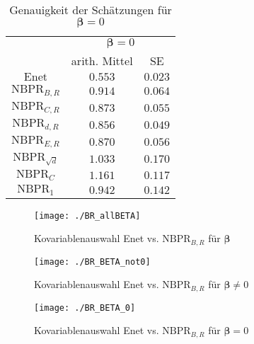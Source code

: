 \documentclass{beamer}
\begin{document}
\begin{frame}
\begin{table}[h]
\begin{tabular}{ccc}
\multicolumn{1}{l}{}     & \multicolumn{2}{c}{$\boldsymbol{\beta}=0$} \\ \cline{2-3} 
\multicolumn{1}{l}{}     & arith. Mittel           & SE               \\ \cline{2-3} 
$\text{Enet}$            & $0.553$                 & $0.023$          \\
$\text{NBPR}_{B,R}$      & $0.914$                 & $0.064$          \\
$\text{NBPR}_{C,R}$      & $0.873$                 & $0.055$          \\
$\text{NBPR}_{d,R}$      & $0.856$                 & $0.049$          \\
$\text{NBPR}_{E,R}$      & $0.870$                 & $0.056$          \\
$\text{NBPR}_{\sqrt{d}}$ & $1.033$                 & $0.170$          \\
$\text{NBPR}_{C}$        & $1.161$                 & $0.117$          \\
$\text{NBPR}_{1}$        & $0.942$                 & $0.142$         
\end{tabular}
\caption{Genauigkeit der Schätzungen für $\boldsymbol{\beta}=0$}
\end{table}
\end{frame}


\begin{frame}
	\begin{figure}
	\centering
	\texttt{[image: ./BR\_allBETA]}
	\caption{Kovariablenauswahl Enet vs. $\text{NBPR}_{B,R}$ für $\boldsymbol{\beta}$}
	\label{fig:a}
	\end{figure}
\end{frame}
\begin{frame}
	\begin{figure}
	\centering
	\texttt{[image: ./BR\_BETA\_not0]}
	\caption{Kovariablenauswahl Enet vs. $\text{NBPR}_{B,R}$ für $\boldsymbol{\beta} \neq 0$}
	\label{fig:b}
	\end{figure}
\end{frame}
\begin{frame}
	\begin{figure}
	\centering
	\texttt{[image: ./BR\_BETA\_0]}
	\caption{Kovariablenauswahl Enet vs. $\text{NBPR}_{B,R}$ für $\boldsymbol{\beta} = 0$}
	\label{fig:c}
	\end{figure}
\end{frame}
\end{document}
